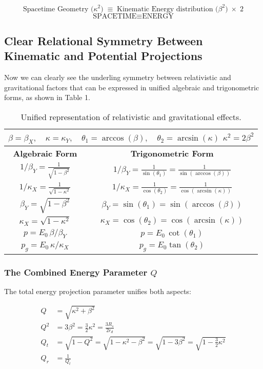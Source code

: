 \documentclass[12pt, a4paper]{article}
\begin{document}
\[
\boxed{\text{Spacetime Geometry (}\kappa^{2}\text{)} \;\equiv\; \text{Kinematic Energy distribution (}\beta^{2}\text{)}\;\times\;2}
\]
\[
\boxed{\text{SPACETIME} \equiv \text{ENERGY}}
\]

\subsection{Clear Relational Symmetry Between Kinematic and Potential Projections }

Now we can clearly see the underling symmetry between relativistic and gravitational factors that can be expressed in unified algebraic and trigonometric forms, as shown in Table 1.


\begin{table}[h]
\centering
\begin{tabular}{|c|c|}\hline
\multicolumn{2}{|c|}{\(\beta=\beta_X,\quad  \kappa=\kappa_Y,\quad \theta_1= \arccos(\beta),\quad \theta_2 = \arcsin(\kappa)\)  $\kappa^2 = 2\beta^2$}\\
\hline
\textbf{Algebraic Form} & \textbf{Trigonometric Form} \\
\hline
$1/\beta_Y= \frac{1}{\sqrt{1-\beta^2}}$& $1/\beta_Y = \frac{1}{\sin(\theta_1)} = \frac{1}{\sin(\arccos(\beta))}$\\
\hline
$1/\kappa_X = \frac{1}{\sqrt{1-\kappa^2}}$& $1/\kappa_X  = \frac{1}{\cos(\theta_2)} = \frac{1}{\cos(\arcsin(\kappa))}$\\
\hline
$\beta_Y = \sqrt{1-\beta^2}$& $\beta_Y = \sin(\theta_1) = \sin(\arccos(\beta))$\\
\hline
$\kappa_X = \sqrt{1-\kappa^2}$&$\kappa_X = \cos(\theta_2) = \cos(\arcsin(\kappa))$\\
\hline
 $p=E_0\,\beta/\beta_Y$&$p=E_0\,\cot(\theta_1) $\\
 \hline
 $p_g=E_0\,\kappa/\kappa_X$&$p_g=E_0 \tan(\theta_2)$\\
 \hline
\end{tabular}
\caption{Unified representation of relativistic and gravitational effects.}
\end{table}

\subsubsection{The Combined Energy Parameter $Q$}

The total energy projection parameter unifies both aspects:

\begin{align}
    Q &=\sqrt{\kappa^2 + \beta^2}  \\
    Q^{2}&= 3\beta^2 = \frac{3}{2}\kappa^2 = \frac{3R_s}{2r_{d}} \\
    Q_t &= \sqrt{1-Q^2} = \sqrt{1-\kappa^2-\beta^2} = \sqrt{1-3\beta^2} = \sqrt{1-\frac{3}{2}\kappa^2} \\
    Q_r &= \frac{1}{Q_t}
\end{align}
\end{document}
